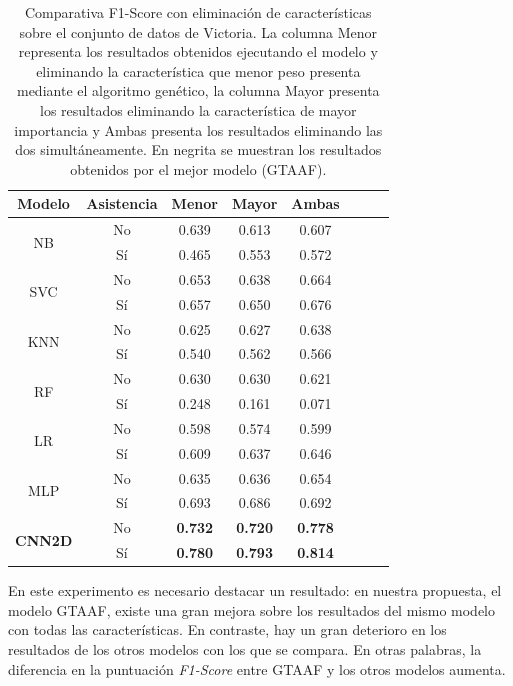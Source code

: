 \documentclass{uathesis-es}
\begin{document}
{\begin{table}[H]
\begin{center}
\begin{tabular}{|c|c||c|c|c|c|c|c|}
					\textbf{Modelo} & Asistencia & Menor & Mayor & Ambas
					\\ \hline \hline
					
					\multirow{2}{*}{NB} &
					No & 0.639 & 0.613 & 0.607\\ &
					Sí  & 0.465 & 0.553 & 0.572 \\ \hline \hline
					\multirow{2}{*}{SVC} &
					No & 0.653 & 0.638 & 0.664\\ &
					Sí  & 0.657 & 0.650 & 0.676 \\ \hline \hline
					\multirow{2}{*}{KNN} &
					No & 0.625 & 0.627 & 0.638\\ &
					Sí  & 0.540 & 0.562 & 0.566 \\ \hline \hline
					\multirow{2}{*}{RF} &
					No & 0.630 & 0.630 & 0.621\\ &
					Sí  & 0.248 & 0.161 & 0.071 \\ \hline \hline
					\multirow{2}{*}{LR} &
					No & 0.598 & 0.574 & 0.599\\ &
					Sí  & 0.609 & 0.637 & 0.646 \\ \hline \hline
					\multirow{2}{*}{MLP} &
					No & 0.635 & 0.636 & 0.654\\ &
					Sí  & 0.693 & 0.686 & 0.692 \\ \hline \hline
					\multirow{2}{*}{\textbf{CNN2D}} &
					No & \textbf{0.732} & \textbf{0.720} & \textbf{0.778}\\ &
					Sí  & \textbf{0.780} & \textbf{0.793} & \textbf{0.814} \\ \hline \hline
				\end{tabular}
			\end{center}
			\caption{Comparativa F1-Score con eliminación de características sobre el conjunto de datos de Victoria. La columna Menor representa los resultados obtenidos ejecutando el modelo y eliminando la característica que menor peso presenta mediante el algoritmo genético, la columna Mayor presenta los resultados eliminando la característica de mayor importancia y Ambas presenta los resultados eliminando las dos simultáneamente. En negrita se muestran los resultados obtenidos por el mejor modelo (GTAAF).}
			\label{Victorialoss}
		\end{table}
		
		En este experimento es necesario destacar un resultado: en nuestra propuesta, el modelo GTAAF, existe una gran mejora sobre los resultados del mismo modelo con todas las características. En contraste, hay un gran deterioro en los resultados de los otros modelos con los que se compara. En otras palabras, la diferencia en la puntuación \textit{F1-Score} entre GTAAF y los otros modelos aumenta.
		
}
\end{document}
